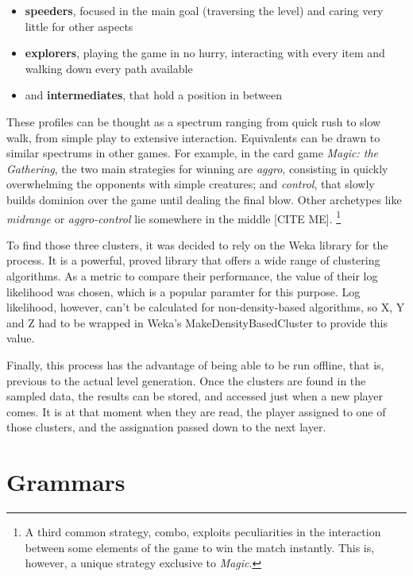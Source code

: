 \documentclass[conference]{IEEEtran}
\begin{document}
\begin{itemize}
	
	\item \textbf{speeders}, focused in the main goal (traversing the level) and caring very little for other aspects
	
	\item \textbf{explorers}, playing the game in no hurry, interacting with every item and walking down every path available
	
	\item and \textbf{intermediates}, that hold a position in between
	
\end{itemize}

These profiles can be thought as a spectrum ranging from quick rush to slow walk, from simple play to extensive interaction. Equivalents can be drawn to similar spectrums in other games. For example, in the card game \textit{Magic: the Gathering}, the two main strategies for winning are \textit{aggro}, consisting in quickly overwhelming the opponents with simple creatures; and \textit{control}, that slowly builds dominion over the game until dealing the final blow. Other archetypes like \textit{midrange} or \textit{aggro-control} lie somewhere in the middle [CITE ME]. \footnote{A third common strategy, combo, exploits peculiarities in the interaction between some elements of the game to win the match instantly. This is, however, a unique strategy exclusive to \textit{Magic}. } 

To find those three clusters, it was decided to rely on the Weka library for the process. It is a powerful, proved library that offers a wide range of clustering algorithms. As a metric to compare their performance, the value of their log likelihood was chosen, which is a popular paramter for this purpose. Log likelihood, however, can't be calculated for non-density-based algorithms, so X, Y and Z had to be wrapped in Weka's MakeDensityBasedCluster to provide this value.

Finally, this process has the advantage of being able to be run offline, that is, previous to the actual level generation. Once the clusters are found in the sampled data, the results can be stored, and accessed just when a new player comes. It is at that moment when they are read, the player assigned to one of those clusters, and the assignation passed down to the next layer.

\section{Grammars}
\end{document}

